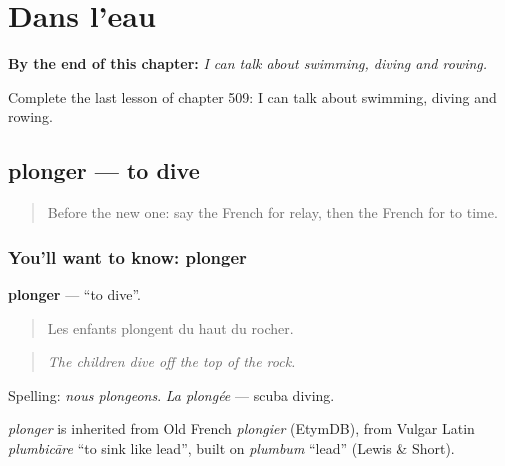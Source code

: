 
\chapter{Dans l'eau}
\label{ch:fr-dans-l-eau}

\begin{chapteropening}
\textbf{By the end of this chapter:} \emph{I can talk about swimming, diving and rowing.}

Complete the last lesson of chapter 509: I can talk about swimming, diving and rowing.
\end{chapteropening}

\section[plonger]{plonger — to dive}

\label{lesson:FR-C509-plonger}



\begin{quote}
Before the new one: say the French for relay, then the French for to time.
\end{quote}

\subsection*{You'll want to know: plonger}
\textbf{plonger} — \textquotedblleft{}to dive\textquotedblright{}.

\begin{quote}
Les enfants plongent du haut du rocher.
\end{quote}

\begin{quote}
\emph{The children dive off the top of the rock.}
\end{quote}

Spelling: \emph{nous plongeons}. \emph{La plongée} — scuba diving.

\begin{cousinweb}
\emph{plonger} is inherited from Old French \emph{plongier} (EtymDB), from Vulgar Latin \emph{plumbicāre} \textquotedblleft{}to sink like lead\textquotedblright{}, built on \emph{plumbum} \textquotedblleft{}lead\textquotedblright{} (Lewis \& Short).
\end{cousinweb}

